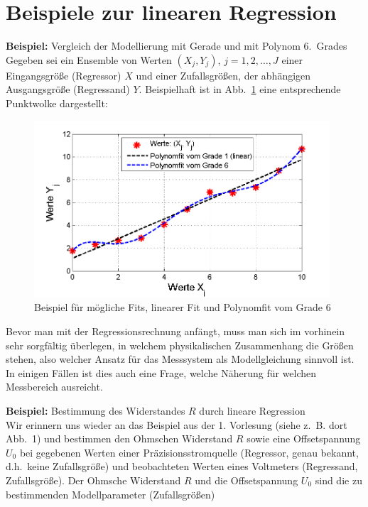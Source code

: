 \section{Beispiele zur linearen Regression}
\label{subsection:lineare-Regression}
\textbf{Beispiel:} Vergleich der Modellierung mit Gerade und mit Polynom 6.~Grades \\
Gegeben sei ein Ensemble von Werten
$(X_j,Y_j )$, $j = 1,2,\ldots ,J$ einer Eingangsgröße (Regressor) $X$ und einer Zufallsgrößen,
der abhängigen Ausgangsgröße (Regressand) $Y$.
Beispielhaft ist in Abb.~\ref{fig:LineareRegression} eine
entsprechende Punktwolke dargestellt:
\begin{figure}[!htbp]
	\centering
	\includegraphics[width=11cm]{02_vorlesung/media/Regression_der_WertePaare.png}
    \caption{Beispiel für mögliche Fits, linearer Fit und Polynomfit vom Grade 6} \label{fig:LineareRegression}
\end{figure}
Bevor man mit der Regressionsrechnung anfängt, muss man sich im vorhinein sehr sorgfältig
überlegen, in welchem physikalischen Zusammenhang die Größen stehen, also welcher
Ansatz für das Messsystem als Modellgleichung sinnvoll ist.
In einigen Fällen ist dies auch eine Frage, welche Näherung für welchen Messbereich
ausreicht. 

\textbf{Beispiel:} Bestimmung des Widerstandes $R$ durch lineare Regression \\
Wir erinnern uns wieder an das Beispiel aus der 1. Vorlesung (siehe z.~B. dort Abb.~1) und bestimmen den Ohmschen Widerstand $R$ sowie eine Offsetspannung $U_0$ bei gegebenen Werten einer
Präzisions\-strom\-quelle (Regressor, genau bekannt, d.h.\ keine Zufallsgröße) und beobachteten
Werten eines Voltmeters (Regressand, Zufallsgröße). 
Der Ohmsche Widerstand $R$ und die Offsetspannung $U_0$ sind die zu bestimmenden Modellparameter (Zufallsgrößen)

